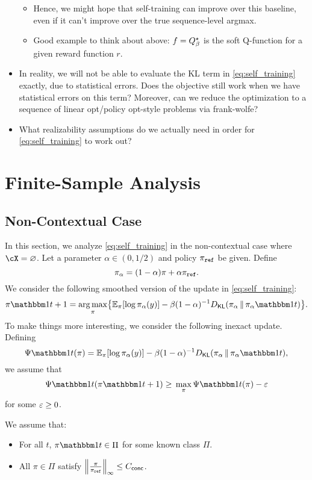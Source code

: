 \documentclass{article}
\begin{document}
\begin{itemize}
  \begin{itemize}
  \item Hence, we might hope that self-training can improve over this
    baseline, even if it can't improve over the true sequence-level
    argmax.
  \item Good example to think about above: $f=\Qstarb$ is the soft
    Q-function for a given reward function $r$.
  \end{itemize}
\item In reality, we will not be able to evaluate the KL term in
  \cref{eq:self_training} exactly, due to statistical errors. Does the
  objective still work when we have statistical errors on this term?
  Moreover, can we reduce the optimization to a sequence of linear
  opt/policy opt-style problems via frank-wolfe?
\item What realizability assumptions do we actually need in order for
  \cref{eq:self_training} to work out?
\end{itemize}

\section{Finite-Sample Analysis}

  \subsection{Non-Contextual Case}
  \newcommand{\sm}{\alpha}
  \newcommand{\ystar}{y^{\star}}
  \newcommand{\ones}{\mb{1}}
  \newcommand{\pia}{\pi_{\alpha}}
In this section, we analyze \cref{eq:self_training} in the
non-contextual case where $\cX=\emptyset$. Let a parameter
$\sm\in(0,1/2)$ and policy $\piref$ be given. Define
\[
  \pi_\alpha = (1-\alpha)\pi + \alpha\piref.
\]
We consider the following smoothed version
of the update in \cref{eq:self_training}:
\begin{align}
  \pi\ind{t+1}=\argmax_{\pi}\crl*{
  \En_{\pi}\brk*{\log\pi_\alpha(y)}
  -\beta(1-\alpha)^{-1}\Dkl{\pi_\alpha}{\pi_\alpha\ind{t}}
  }.
\end{align}
To make things more interesting, we consider the following inexact
update. Defining
\[
\Psi\ind{t}(\pi) =     \En_{\pi}\brk*{\log\pi_\alpha(y)}
-\beta(1-\alpha)^{-1}\Dkl{\pi_\alpha}{\pi_\alpha\ind{t}},
\]
we assume that
\begin{align}
  \label{eq:pit}
\Psi\ind{t}(\pi\ind{t+1})\geq{}\max_{\pi}\Psi\ind{t}(\pi) - \veps
\end{align}
for some $\veps\geq{}0$.
\begin{assumption} We assume that:
  \begin{itemize}
  \item For all $t$, $\pi\ind{t}\in\Pi$ for some known class $\Pi$.
  \item All $\pi\in\Pi$ satisfy $\nrm*{\frac{\pi}{\piref}}_{\infty}\leq{}\Cconc$.
  \end{itemize}
  
\end{assumption}
\end{document}
